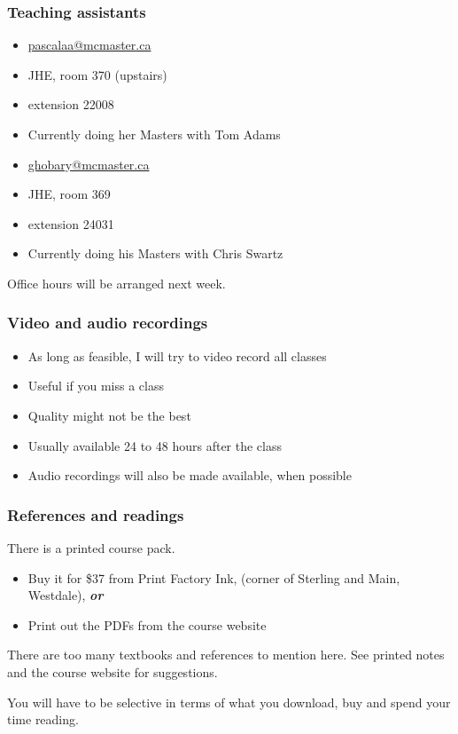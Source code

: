 \begin{frame}\frametitle{Teaching assistants}
	{\color{myGreen}{Alicia Pascall}}
	\begin{itemize}
		\item	\url{pascalaa@mcmaster.ca}
		\item	JHE, room 370 (upstairs)
		\item	extension 22008
		\item	Currently doing her Masters with Tom Adams
	\end{itemize}
	\vspace{12pt}
	{\color{myGreen}{Yasser Ghobara}}
	\begin{itemize}
		\item	\url{ghobary@mcmaster.ca}
		\item	JHE, room 369
		\item	extension 24031
		\item	Currently doing his Masters with Chris Swartz
	\end{itemize}
	\vspace{12pt}
	Office hours will be arranged next week.
\end{frame}

\begin{frame}\frametitle{Video and audio recordings}
	\begin{itemize}
		\item	As long as feasible, I will try to video record all classes
		\item	Useful if you miss a class
		\item	Quality might not be the best
		\item	Usually available 24 to 48 hours after the class
		\item	Audio recordings will also be made available, when possible
	\end{itemize}
\end{frame}

\begin{frame}\frametitle{References and readings}
	
	There is a printed course pack.
	\vspace{12pt}
	\begin{itemize}
		\item	Buy it for \$37 from Print Factory Ink, (corner of Sterling and Main, Westdale), \emph{\textbf{or}}
		\item	Print out the PDFs from the course website
	\end{itemize}
	\vspace{12pt}
	There are too many textbooks and references to mention here. See printed notes and the course website for suggestions.
	
	\vspace{6pt}
	You will have to be selective in terms of what you download, buy and spend your time reading.
\end{frame}

